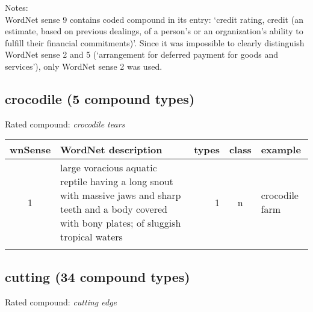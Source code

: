 \noindent
Notes:\\WordNet sense 9 contains coded compound in its entry: `credit rating,
credit (an estimate, based on previous dealings, of a person's or an
organization's ability to fulfill their financial
commitments)'. Since it was impossible to clearly distinguish WordNet sense 2
and 5 (`arrangement for deferred payment for goods and services'), only
WordNet sense 2 was used.

\subsection{crocodile    (5 compound types)}
Rated compound: \emph{crocodile tears}


\vspace*{1ex}

\noindent
\begin{longtable}{c>{\raggedright\arraybackslash}p{5cm}rc>{\raggedright\arraybackslash}p{2cm}}\lsptoprule
{\small wnSense}&WordNet description&types&class&example\\\midrule
1&large voracious aquatic reptile having a long snout with massive jaws and sharp teeth and a body covered with bony plates; of sluggish tropical waters&1&n&crocodile farm\\\lspbottomrule
\end{longtable}


\subsection{cutting      (34 compound types)}
Rated compound: \emph{cutting edge}

